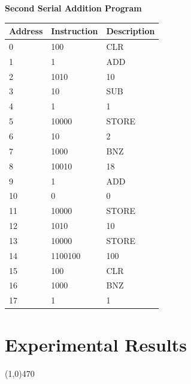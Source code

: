 \documentclass[12pt]{article}
\begin{document}
\begin{center}
\newpage
\textbf{Second Serial Addition Program}\\

\begin{tabular}{|l|l|l|}
\hline
Address & Instruction & Description \\
\hline
0       & 100	&CLR       \\
1       & 1		&ADD           \\
2       & 1010	&10        \\
3       & 10	&SUB         \\
4       & 1		&1          \\
5       & 10000	&STORE       \\
6       & 10	&2          \\
7       & 1000	&BNZ        \\
8       & 10010	&18       \\
9       & 1 	&ADD          \\
10      & 0		&0           \\
11      & 10000	&STORE       \\
12      & 1010	&10        \\
13      & 10000	&STORE       \\
14      & 1100100	&100     \\
15      & 100	&CLR         \\
16      & 1000	&BNZ        \\
17      & 1   	&1        \\
\hline
\end{tabular}
\end{center}


\newpage			
\section{Experimental Results}\vspace{-.7cm} \line(1,0){470}

\begin{center}
	
\end{center}
\end{document}
